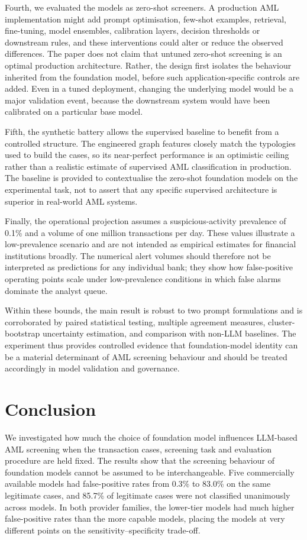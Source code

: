 \documentclass[pdflatex,sn-basic,Numbered]{sn-jnl}
\begin{document}
Fourth, we evaluated the models as zero-shot screeners. A production AML implementation might add prompt optimisation, few-shot examples, retrieval, fine-tuning, model ensembles, calibration layers, decision thresholds or downstream rules, and these interventions could alter or reduce the observed differences. The paper does not claim that untuned zero-shot screening is an optimal production architecture. Rather, the design first isolates the behaviour inherited from the foundation model, before such application-specific controls are added. Even in a tuned deployment, changing the underlying model would be a major validation event, because the downstream system would have been calibrated on a particular base model.

Fifth, the synthetic battery allows the supervised baseline to benefit from a controlled structure. The engineered graph features closely match the typologies used to build the cases, so its near-perfect performance is an optimistic ceiling rather than a realistic estimate of supervised AML classification in production. The baseline is provided to contextualise the zero-shot foundation models on the experimental task, not to assert that any specific supervised architecture is superior in real-world AML systems.

Finally, the operational projection assumes a suspicious-activity prevalence of 0.1\% and a volume of one million transactions per day. These values illustrate a low-prevalence scenario and are not intended as empirical estimates for financial institutions broadly. The numerical alert volumes should therefore not be interpreted as predictions for any individual bank; they show how false-positive operating points scale under low-prevalence conditions in which false alarms dominate the analyst queue.

Within these bounds, the main result is robust to two prompt formulations and is corroborated by paired statistical testing, multiple agreement measures, cluster-bootstrap uncertainty estimation, and comparison with non-LLM baselines. The experiment thus provides controlled evidence that foundation-model identity can be a material determinant of AML screening behaviour and should be treated accordingly in model validation and governance.

\section{Conclusion}\label{sec:conclusion}

We investigated how much the choice of foundation model influences LLM-based AML screening when the transaction cases, screening task and evaluation procedure are held fixed. The results show that the screening behaviour of foundation models cannot be assumed to be interchangeable. Five commercially available models had false-positive rates from 0.3\% to 83.0\% on the same legitimate cases, and 85.7\% of legitimate cases were not classified unanimously across models. In both provider families, the lower-tier models had much higher false-positive rates than the more capable models, placing the models at very different points on the sensitivity--specificity trade-off.
\end{document}
